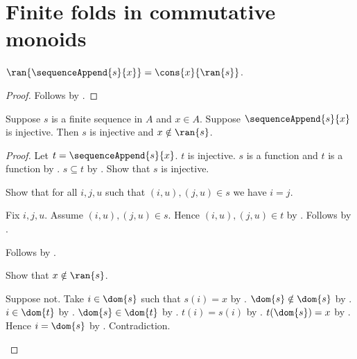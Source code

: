 




\section{Finite folds in commutative monoids}

\begin{proposition}\label{monoid_sequence_append_range}
    $\ran{\sequenceAppend{s}{x}}=\cons{x}{\ran{s}}$.
\end{proposition}
\begin{proof}
    Follows by .
\end{proof}

\begin{proposition}\label{monoid_sequence_append_injective_elim}
    Suppose $s$ is a finite sequence in $A$ and $x\in A$.
    Suppose $\sequenceAppend{s}{x}$ is injective.
    Then $s$ is injective and $x\notin\ran{s}$.
\end{proposition}
\begin{proof}
    Let $t=\sequenceAppend{s}{x}$.
    $t$ is injective.
    $s$ is a function and $t$ is a function by
        .
    $s\subseteq t$ by .
    Show that $s$ is injective.
    \begin{subproof}
        Show that for all $i,j,u$ such that $(i,u),(j,u)\in s$ we have
            $i=j$.
        \begin{subproof}
            Fix $i,j,u$.
            Assume $(i,u),(j,u)\in s$.
            Hence $(i,u),(j,u)\in t$ by .
            Follows by .
        \end{subproof}
        Follows by .
    \end{subproof}
    Show that $x\notin\ran{s}$.
    \begin{subproof}
        Suppose not.
        Take $i\in\dom{s}$ such that $s(i)=x$ by
            .
        $\dom{s}\notin\dom{s}$ by .
        $i\in\dom{t}$ by
            .
        $\dom{s}\in\dom{t}$ by
            .
        $t(i)=s(i)$ by .
        $t(\dom{s})=x$ by .
        Hence $i=\dom{s}$ by .
        Contradiction.
    \end{subproof}
\end{proof}

